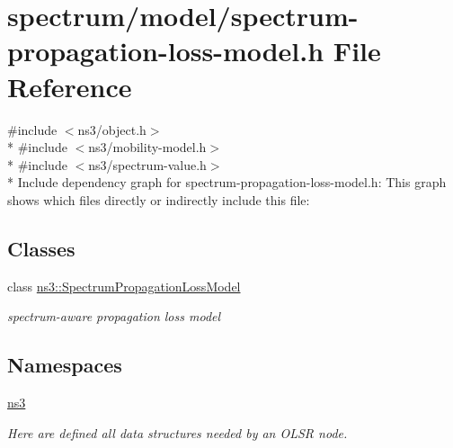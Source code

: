 \hypertarget{spectrum-propagation-loss-model_8h}{}\section{spectrum/model/spectrum-\/propagation-\/loss-\/model.h File Reference}
\label{spectrum-propagation-loss-model_8h}
{\ttfamily \#include $<$ns3/object.\+h$>$}\\*
{\ttfamily \#include $<$ns3/mobility-\/model.\+h$>$}\\*
{\ttfamily \#include $<$ns3/spectrum-\/value.\+h$>$}\\*
Include dependency graph for spectrum-\/propagation-\/loss-\/model.h\+:
This graph shows which files directly or indirectly include this file\+:
\subsection*{Classes}
\begin{DoxyCompactItemize}
\item 
class \hyperlink{classns3_1_1SpectrumPropagationLossModel}{ns3\+::\+Spectrum\+Propagation\+Loss\+Model}
\begin{DoxyCompactList}\small\item\em spectrum-\/aware propagation loss model \end{DoxyCompactList}\end{DoxyCompactItemize}
\subsection*{Namespaces}
\begin{DoxyCompactItemize}
\item 
 \hyperlink{namespacens3}{ns3}
\begin{DoxyCompactList}\small\item\em Here are defined all data structures needed by an O\+L\+SR node. \end{DoxyCompactList}\end{DoxyCompactItemize}
